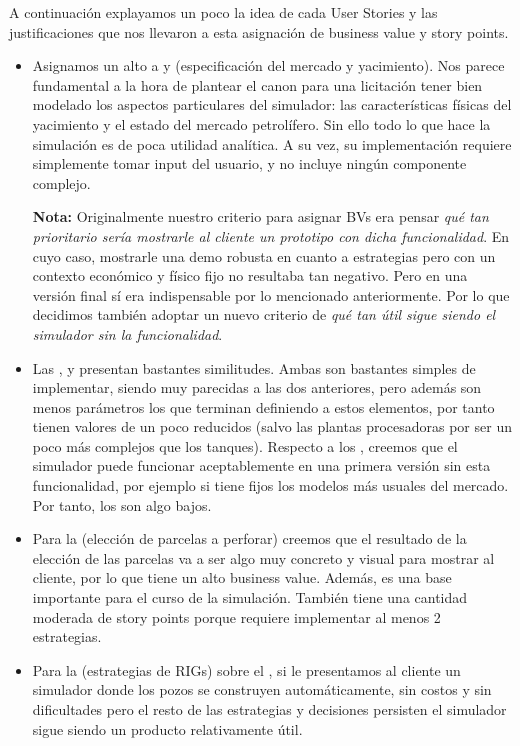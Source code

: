 A continuación explayamos un poco la idea de cada User Stories y las justificaciones que nos llevaron a esta asignación de business value y story points.

\begin{itemize}
  \item Asignamos un alto \BV{} a  y  (especificación del mercado y yacimiento). Nos parece fundamental a la hora de plantear el canon para una licitación tener bien modelado los aspectos particulares del simulador: las características físicas del yacimiento y el estado del mercado petrolífero. Sin ello todo lo que hace la simulación es de poca utilidad analítica. A su vez, su implementación requiere simplemente tomar input del usuario, y no incluye ningún componente complejo.

  \textbf{Nota:} Originalmente nuestro criterio para asignar BVs era pensar \emph{qué tan prioritario sería mostrarle al cliente un prototipo con dicha funcionalidad}. En cuyo caso, mostrarle una demo robusta en cuanto a estrategias pero con un contexto económico y físico fijo no resultaba tan negativo. Pero en una versión final sí era indispensable por lo mencionado anteriormente. Por lo que decidimos también adoptar un nuevo criterio de \emph{qué tan útil sigue siendo el simulador sin la funcionalidad}.

  \item Las ,  y  presentan bastantes similitudes. Ambas son bastantes simples de implementar, siendo muy parecidas a las dos anteriores, pero además son menos parámetros los que  terminan definiendo a estos elementos, por tanto tienen valores de \SP{} un poco reducidos (salvo  las plantas procesadoras por ser un poco más complejos que los tanques). Respecto a los \BV{}, creemos que el simulador puede funcionar aceptablemente en una primera versión sin esta funcionalidad, por ejemplo si tiene fijos los modelos más usuales del mercado. Por tanto, los \BV{} son algo bajos. 

  \item Para la  (elección de parcelas a perforar) creemos que el resultado de la elección de las parcelas va a ser algo muy concreto y visual para mostrar al cliente, por lo que tiene un alto business value. Además, es una base importante para el curso de la simulación.
  También tiene una cantidad moderada de story points porque requiere implementar al menos 2 estrategias.

  \item Para la  (estrategias de RIGs) sobre el \BV{}, si le presentamos al cliente un simulador donde los pozos se construyen automáticamente, sin costos y sin dificultades pero el resto de las estrategias y decisiones persisten el simulador sigue siendo un producto relativamente útil.


\end{itemize}
